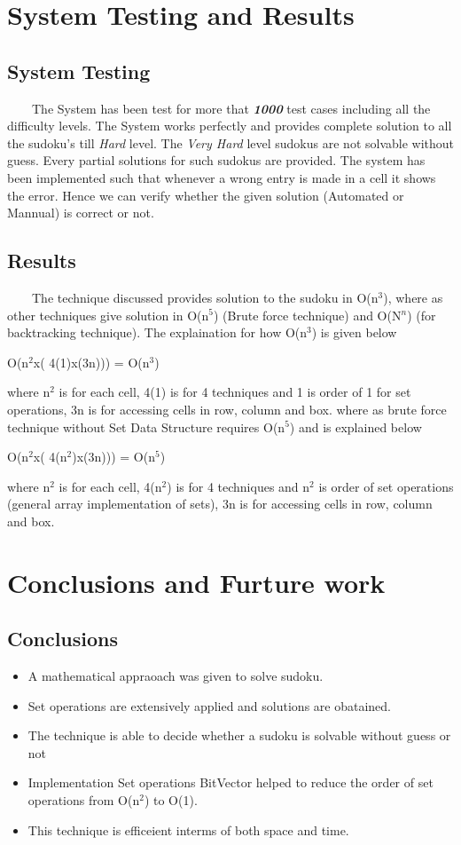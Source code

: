 \documentclass[12pt,a4paper]{article}
\begin{document}
\section{System Testing and Results}
\subsection{System Testing}
\ \ \ \ The System has been test for more that \textit{\textbf{1000}} test cases including all the difficulty levels. The System works perfectly and provides complete solution to all the sudoku's till \textit{Hard} level. The \textit{Very Hard} level sudokus are not solvable without guess. Every partial solutions for such sudokus are provided. The system has been implemented such that whenever a wrong entry is made in a cell it shows the error. Hence we can verify whether the given solution (Automated or Mannual) is correct or not.
\subsection{Results}
\ \ \ \ The technique discussed provides solution to the sudoku in O(n$^3$), where as other techniques give solution in O(n$^5$) (Brute force technique) and O(N$^n$) (for backtracking technique). The explaination for how O(n$^3$) is given below
\begin{center}
O(n$^2$x( 4(1)x(3n))) = O(n$^3$)
\end{center}
where n$^2$ is for each cell, 4(1) is for 4 techniques and 1 is order of 1 for set operations, 3n is for accessing cells in row, column and box.
where as brute force technique without Set Data Structure requires O(n$^5$) and is explained below
\begin{center}
O(n$^2$x( 4(n$^2$)x(3n))) = O(n$^5$)
\end{center}
where n$^2$ is for each cell, 4(n$^2$) is for 4 techniques and n$^2$ is order of set operations (general array implementation of sets), 3n is for accessing cells in row, column and box.


\section{Conclusions and Furture work}
\subsection{Conclusions}
\begin{itemize}
\item{A mathematical appraoach was given to solve sudoku.}
\item{Set operations are extensively applied and solutions are obatained.}
\item{The technique is able to decide whether a sudoku is solvable without guess or not}
\item{Implementation Set operations BitVector helped to reduce the order of set operations from O(n$^2$) to O(1).}
\item{This technique is efficeient interms of both space and time.}
\end{itemize}
\end{document}
